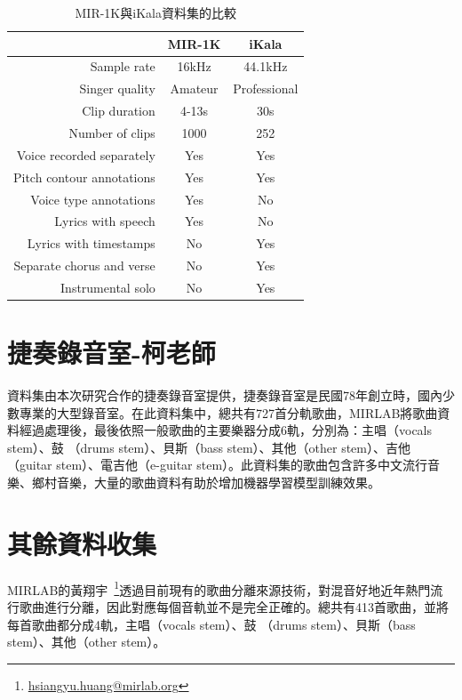 \begin{table}[h!]
\centering
\begin{tabular}{|r|c|c|}
\hline
\textbf{}                 & \textbf{MIR-1K} & \textbf{iKala} \\ \hline
Sample rate               & 16kHz           & 44.1kHz        \\ \hline
Singer quality            & Amateur         & Professional   \\ \hline
Clip duration             & 4-13s           & 30s            \\ \hline
Number of clips           & 1000            & 252            \\ \hline
Voice recorded separately & Yes             & Yes            \\ \hline
Pitch contour annotations & Yes             & Yes            \\ \hline
Voice type annotations    & Yes             & No             \\ \hline
Lyrics with speech        & Yes             & No             \\ \hline
Lyrics with timestamps    & No              & Yes            \\ \hline
Separate chorus and verse & No              & Yes            \\ \hline
Instrumental solo         & No              & Yes            \\ \hline
\end{tabular}
\caption{MIR-1K與iKala資料集的比較}
\label{comp_mir_1k_with_ikala}
\end{table}

\section{捷奏錄音室-柯老師}
資料集由本次研究合作的捷奏錄音室提供，捷奏錄音室是民國78年創立時，國內少數專業的大型錄音室。在此資料集中，總共有727首分軌歌曲，MIRLAB將歌曲資料經過處理後，最後依照一般歌曲的主要樂器分成6軌，分別為：主唱（vocals stem）、鼓 （drums stem）、貝斯（bass stem）、其他（other stem）、吉他（guitar stem）、電吉他（e-guitar stem）。此資料集的歌曲包含許多中文流行音樂、鄉村音樂，大量的歌曲資料有助於增加機器學習模型訓練效果。

\section{其餘資料收集}
MIRLAB的黃翔宇~\footnote{\url{hsiangyu.huang@mirlab.org}}透過目前現有的歌曲分離來源技術，對混音好地近年熱門流行歌曲進行分離，因此對應每個音軌並不是完全正確的。總共有413首歌曲，並將每首歌曲都分成4軌，主唱（vocals stem）、鼓 （drums stem）、貝斯（bass stem）、其他（other stem）。